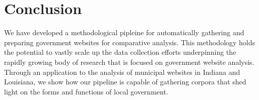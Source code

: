 \documentclass[11pt]{article}
\begin{document}
\section{Conclusion}

We have developed a methodological pipleine for automatically gathering and preparing government websites for comparative analysis. This methodology holds the potential to vastly scale up the data collection efforts underpinning the rapidly growing body of research that is focused on government website analysis. Through an application to the analysis of municipal websites in Indiana and Louisiana, we show how our pipeline is capable of gathering corpora that shed light on the forms and functions of local government.


\newpage

%

\end{document}
